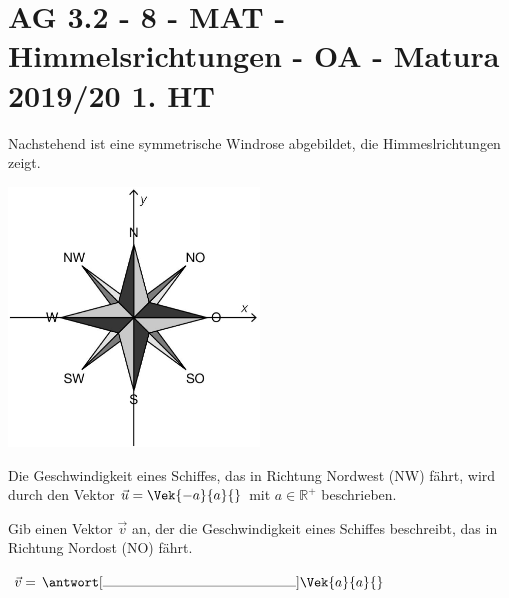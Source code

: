 \section{AG 3.2 - 8 - MAT - Himmelsrichtungen - OA - Matura 2019/20 1. HT}

\begin{beispiel}[AG 3.2]{1}
Nachstehend ist eine symmetrische Windrose abgebildet, die Himmeslrichtungen zeigt.

\begin{center}
\includegraphics[width=0.5\textwidth]{../_database/Bilder/AG32_8_windrose.eps}
\end{center}

Die Geschwindigkeit eines Schiffes, das in Richtung Nordwest (NW) fährt, wird durch den Vektor $\vec{u}=\Vek{-a}{a}{}$ mit $a\in\mathbb{R}^+$ beschrieben.

Gib einen Vektor $\vec{v}$ an, der die Geschwindigkeit eines Schiffes beschreibt, das in Richtung Nordost (NO) fährt.\leer

$\vec{v}=\,\antwort[\rule{5cm}{0.3pt}]{\Vek{a}{a}{}}$

\end{beispiel}